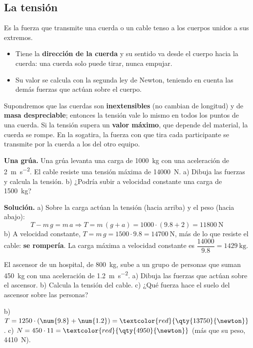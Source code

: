 \subsection{La tensión}

\begin{definition}[Tensión]
    Es la fuerza que transmite una cuerda o un cable tenso a los cuerpos unidos a sus extremos.
\end{definition}

\begin{itemize}
    \item Tiene la \textbf{dirección de la cuerda} y su sentido va desde el cuerpo hacia la cuerda: una cuerda solo puede tirar, nunca
    empujar.
    \item Su valor se calcula con la segunda ley de Newton, teniendo en cuenta las demás fuerzas que actúan sobre el cuerpo.
\end{itemize}

Supondremos que las cuerdas son \textbf{inextensibles} (no cambian de longitud) y de \textbf{masa despreciable}; entonces la tensión
vale lo mismo en todos los puntos de una cuerda. Si la tensión supera un \textbf{valor máximo}, que depende del material, la cuerda se
rompe. En la sogatira, la fuerza con que tira cada participante se transmite por la cuerda a los del otro equipo.

\begin{example}
    \textbf{Una grúa.} Una grúa levanta una carga de \qty{1000}{\kg} con una aceleración de \qty{2}{\m\per\s\squared}. El cable
    resiste una tensión máxima de \qty{14000}{\newton}. a) Dibuja las fuerzas y calcula la tensión. b) ¿Podría subir a velocidad
    constante una carga de \qty{1500}{\kg}?

    \textbf{Solución.} a) Sobre la carga actúan la tensión (hacia arriba) y el peso (hacia abajo):
    \[ T - m\,g = m\,a \Rightarrow T = m\,(g + a) = 1000 \cdot (\num{9.8} + 2) = \qty{11800}{\newton} \]
    b) A velocidad constante, \(T = m\,g = 1500 \cdot \num{9.8} = \qty{14700}{\newton}\), más de lo que resiste el cable: \textbf{se
    rompería}. La carga máxima a velocidad constante es \(\dfrac{14000}{\num{9.8}} = \qty{1429}{\kg}\).
\end{example}

\begin{exercise}
    El ascensor de un hospital, de \qty{800}{\kg}, sube a un grupo de personas que suman \qty{450}{\kg} con una aceleración de
    \qty{1.2}{\m\per\s\squared}. a) Dibuja las fuerzas que actúan sobre el ascensor. b) Calcula la tensión del cable. c) ¿Qué fuerza
    hace el suelo del ascensor sobre las personas?
    \begin{solu}
        b) \(T = 1250 \cdot (\num{9.8} + \num{1.2}) = \textcolor{red}{\qty{13750}{\newton}}\).
        c) \(N = 450 \cdot 11 = \textcolor{red}{\qty{4950}{\newton}}\) (más que su peso, \qty{4410}{\newton}).
    \end{solu}
\end{exercise}

